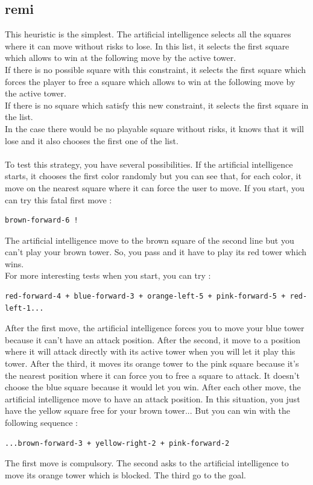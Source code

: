 \documentclass[a4paper, 11pt]{article}
\begin{document}
\subsection{remi}
This heuristic is the simplest. The artificial intelligence selects all the squares where it can move without risks to lose. In this list, it selects the first square which allows to win at the following move by the active tower.\\
If there is no possible square with this constraint, it selects the first square which forces the player to free a square which allows to win at the following move by the active tower.\\
If there is no square which satisfy this new constraint, it selects the first square in the list.\\
In the case there would be no playable square without risks, it knows that it will lose and it also chooses the first one of the list.\\ \\
To test this strategy, you have several possibilities. If the artificial intelligence starts, it chooses the first color randomly but you can see that, for each color, it move on the nearest square where it can force the user to move.
If you start, you can try this fatal first move : 
\begin{verbatim}
brown-forward-6 !
\end{verbatim}
The artificial intelligence move to the brown square of the second line but you can't play your brown tower. So, you pass and it have to play its red tower which wins.\\
For more interesting tests when you start, you can try :
\begin{verbatim}
red-forward-4 + blue-forward-3 + orange-left-5 + pink-forward-5 + red-left-1...
\end{verbatim}
After the first move, the artificial intelligence forces you to move your blue tower because it can't have an attack position. After the second, it move to a position where it will attack directly with its active tower when you will let it play this tower.
After the third, it moves its orange tower to the pink square because it's the nearest position where it can force you to free a square to attack. It doesn't choose the blue square because it would let you win. After each other move, the artificial intelligence move to have an attack position. 
In this situation, you just have the yellow square free for your brown tower... But you can win with the following sequence : 
\begin{verbatim}
...brown-forward-3 + yellow-right-2 + pink-forward-2
\end{verbatim}
The first move is compulsory. The second asks to the artificial intelligence to move its orange tower which is blocked. The third go to the goal.
\end{document}
